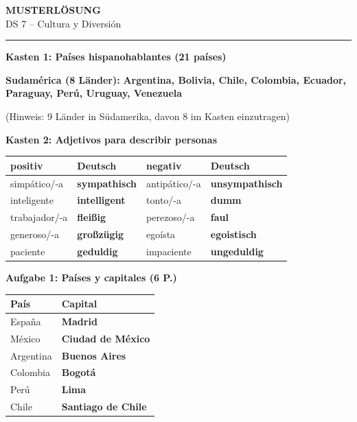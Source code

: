\documentclass[11pt,a4paper]{article}
\newcommand{\lsg}[1]{\textcolor{loesung}{\textbf{#1}}}
\begin{document}
\begin{center}
{\Large\textbf{\textcolor{loesung}{MUSTERLÖSUNG}}}\\[0.3em]
{\large DS 7 -- Cultura y Diversión}
\end{center}

\vspace{0.5em}
\hrule
\vspace{1em}

\begin{gruppenbox}

\textbf{Kasten 1: Países hispanohablantes (21 países)}

\textbf{Sudamérica (8 Länder):} \lsg{Argentina, Bolivia, Chile, Colombia, Ecuador, Paraguay, Perú, Uruguay, Venezuela}

(Hinweis: 9 Länder in Südamerika, davon 8 im Kasten einzutragen)

\vspace{0.8em}

\textbf{Kasten 2: Adjetivos para describir personas}

\begin{tabularx}{\textwidth}{@{}|X|X|X|X|@{}}
\hline
\textbf{positiv} & \textbf{Deutsch} & \textbf{negativ} & \textbf{Deutsch} \\
\hline
simpático/-a & \lsg{sympathisch} & antipático/-a & \lsg{unsympathisch} \\
\hline
inteligente & \lsg{intelligent} & tonto/-a & \lsg{dumm} \\
\hline
trabajador/-a & \lsg{fleißig} & perezoso/-a & \lsg{faul} \\
\hline
generoso/-a & \lsg{großzügig} & egoísta & \lsg{egoistisch} \\
\hline
paciente & \lsg{geduldig} & impaciente & \lsg{ungeduldig} \\
\hline
\end{tabularx}

\vspace{0.8em}

\textbf{Aufgabe 1: Países y capitales (6 P.)}

\begin{tabularx}{\textwidth}{@{}|X|X|@{}}
\hline
\textbf{País} & \textbf{Capital} \\
\hline
España & \lsg{Madrid} \\
\hline
México & \lsg{Ciudad de México} \\
\hline
Argentina & \lsg{Buenos Aires} \\
\hline
Colombia & \lsg{Bogotá} \\
\hline
Perú & \lsg{Lima} \\
\hline
Chile & \lsg{Santiago de Chile} \\
\hline
\end{tabularx}


\end{gruppenbox}
\end{document}
